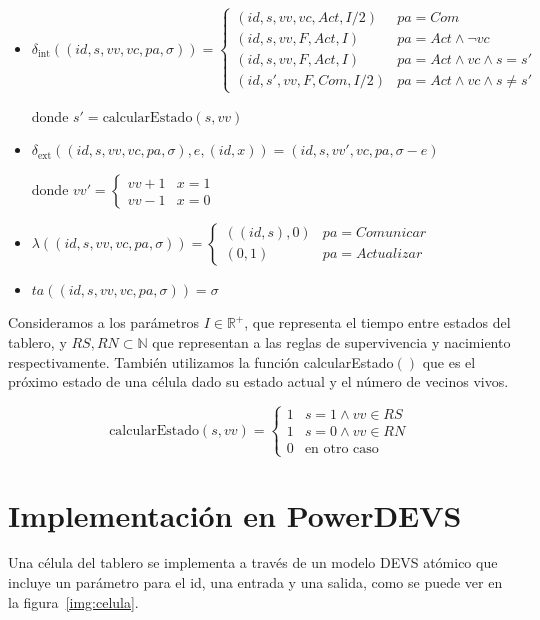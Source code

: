 \documentclass[12pt]{article}
\newcommand{\dint}{\delta_{\text{int}}}
\newcommand{\dext}{\delta_{\text{ext}}}
\newcommand{\estado}{(id, s, vv, vc, pa, \sigma)}
\newcommand{\R}{\mathbb{R}}
\newcommand{\N}{\mathbb{N}}
\begin{document}
\begin{itemize}
  \item $\dint(\estado) = \begin{cases}
      (id, s, vv, vc, Act, I/2) & pa = Com \\
      (id, s, vv, F, Act, I) & pa = Act \land \lnot vc \\
      (id, s, vv, F, Act, I) & pa = Act \land vc \land s = s' \\
      (id, s', vv, F, Com, I/2) & pa = Act \land vc \land s \neq s'
    \end{cases}$

    donde $s' = \text{calcularEstado}(s, vv)$

  \item $\dext(\estado, e, (id, x)) = (id, s, vv', vc, pa, \sigma - e)$

    donde $vv' = \begin{cases}
      vv + 1 & x = 1 \\
      vv - 1 & x = 0
    \end{cases}$

  \item $\lambda(\estado) = \begin{cases}
      ((id, s), 0) & pa = Comunicar \\
      (0, 1) & pa = Actualizar
    \end{cases}$

  \item $ta(\estado) = \sigma$
\end{itemize}

Consideramos a los parámetros $I \in \R^+$, que representa el tiempo entre estados del tablero, y $RS, RN \subset \N$ que representan a las reglas de supervivencia y nacimiento respectivamente. También utilizamos la función calcularEstado$()$ que es el próximo estado de una célula dado su estado actual y el número de vecinos vivos.

\[ \text{calcularEstado}(s, vv) = \begin{cases}
  1 & s = 1 \land vv \in RS \\
  1 & s = 0 \land vv \in RN \\
  0 & \text{en otro caso}
\end{cases}\]


\section{Implementación en PowerDEVS}


Una célula del tablero se implementa a través de un modelo DEVS atómico que incluye un parámetro para el id, una entrada y una salida, como se puede ver en la figura~\ref{img:celula}.
\end{document}

